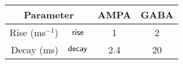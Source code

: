 

\begin{tabular}{rccc}
    \hline
    \multicolumn{2}{c}{\textbf{Parameter}} & \textbf{AMPA} & \textbf{GABA} 
    \\ \hline
    Rise (ms$^{-1}$)    & $\mathsf{rise}$    & 1   & 2
    \\
    Decay (ms)          & $\mathsf{decay}$   & 2.4 & 20
    \\ \hline
\end{tabular}